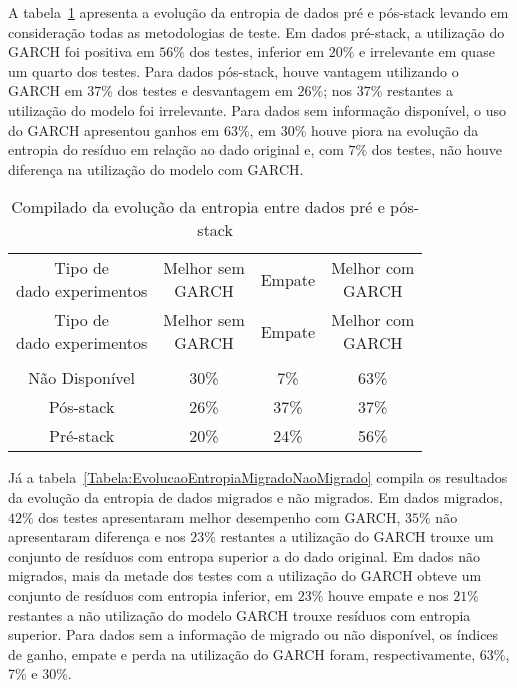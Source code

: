 A tabela~\ref{Tabela:EvolucaoEntropiaPrePosStack} apresenta a evolução da
entropia de dados pré e pós-stack levando em consideração todas as
metodologias de teste. Em dados pré-stack, a utilização do GARCH foi positiva em
$56\%$ dos testes, inferior em $20\%$ e irrelevante em quase um quarto
dos testes. Para dados pós-stack, houve vantagem utilizando o GARCH em $37\%$
dos testes e desvantagem em $26\%$; nos $37\%$ restantes a utilização do modelo
foi irrelevante. Para dados sem informação disponível, o uso do
GARCH apresentou ganhos em $63\%$, em $30\%$ houve piora na evolução da
entropia do resíduo em relação ao dado original e, com $7\%$ dos testes, não
houve diferença na utilização do modelo com GARCH.

\begin{center}
\begin{longtable}{cccc}
\toprule
\rowcolor{white}
\caption{Compilado da evolução da entropia entre dados pré e pós-stack}
\label{Tabela:EvolucaoEntropiaPrePosStack} \\
\midrule
\rowcolor{white}
   \specialcell{Tipo de\\dado experimentos} & \specialcell{Melhor sem\\GARCH} &
   Empate & \specialcell{Melhor com\\GARCH} \\
\midrule
\endfirsthead
\midrule
\rowcolor{white}
   \specialcell{Tipo de\\dado experimentos} & \specialcell{Melhor sem\\GARCH} &
   Empate & \specialcell{Melhor com\\GARCH} \\
\toprule
\endhead
\midrule \\ %
\endfoot
\bottomrule
\endlastfoot
    Não Disponível & 30\%  & 7\%   & 63\% \\
    Pós-stack & 26\%  & 37\%  & 37\% \\
    Pré-stack & 20\%  & 24\%  & 56\% \\
\end{longtable}
\end{center}

Já a tabela~\ref{Tabela:EvolucaoEntropiaMigradoNaoMigrado} compila os resultados
da evolução da entropia de dados migrados e não migrados. Em dados migrados,
$42\%$ dos testes apresentaram melhor desempenho com GARCH, $35\%$ não
apresentaram diferença e nos $23\%$ restantes a utilização do GARCH trouxe um
conjunto de resíduos com entropa superior a do dado original. Em dados não
migrados, mais da metade dos testes com a utilização do GARCH obteve um
conjunto de resíduos com entropia inferior, em $23\%$ houve empate e nos $21\%$
restantes a não utilização do modelo GARCH trouxe resíduos com entropia
superior. Para dados sem a informação de migrado ou não disponível, os índices
de ganho, empate e perda na utilização do GARCH foram, respectivamente, 63\%,
7\% e 30\%.


